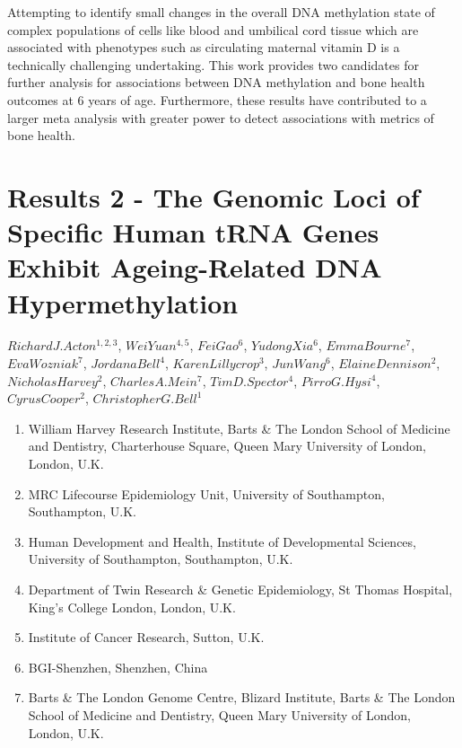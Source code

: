 \documentclass[
]{book}
\providecommand{\tightlist}{%
  \setlength{\itemsep}{0pt}\setlength{\parskip}{0pt}}
\begin{document}
Attempting to identify small changes in the overall DNA methylation state of complex populations of cells like blood and umbilical cord tissue which are associated with phenotypes such as circulating maternal vitamin D is a technically challenging undertaking.
This work provides two candidates for further analysis for associations between DNA methylation and bone health outcomes at 6 years of age.
Furthermore, these results have contributed to a larger meta analysis with greater power to detect associations with metrics of bone health.

\hypertarget{tRNAs}{%
\chapter{Results 2 - The Genomic Loci of Specific Human tRNA Genes Exhibit Ageing-Related DNA Hypermethylation}\label{tRNAs}}

\(Richard J. Acton ^{1,2,3}\), \(Wei Yuan ^{4,5}\), \(Fei Gao ^{6}\), \(Yudong Xia ^{6}\), \(Emma Bourne ^{7}\), \(Eva Wozniak ^{7}\), \(Jordana Bell ^{4}\), \(Karen Lillycrop ^{3}\), \(Jun Wang ^{6}\), \(Elaine Dennison ^{2}\), \(Nicholas Harvey ^{2}\), \(Charles A. Mein ^{7}\), \(Tim D. Spector ^{4}\), \(Pirro G. Hysi ^{4}\), \(Cyrus Cooper ^{2}\), \(Christopher G. Bell ^{1}\)

\begin{enumerate}
\def\labelenumi{\arabic{enumi}.}
\tightlist
\item
  William Harvey Research Institute, Barts \& The London School of Medicine and Dentistry, Charterhouse Square, Queen Mary University of London, London, U.K.
\item
  MRC Lifecourse Epidemiology Unit, University of Southampton, Southampton, U.K.
\item
  Human Development and Health, Institute of Developmental Sciences, University of Southampton, Southampton, U.K.\\
\item
  Department of Twin Research \& Genetic Epidemiology, St Thomas Hospital, King's College London, London, U.K.
\item
  Institute of Cancer Research, Sutton, U.K.
\item
  BGI-Shenzhen, Shenzhen, China
\item
  Barts \& The London Genome Centre, Blizard Institute, Barts \& The London School of Medicine and Dentistry, Queen Mary University of London, London, U.K.
\end{enumerate}
\end{document}
